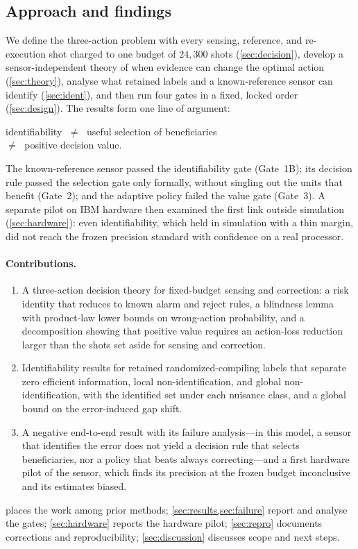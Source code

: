 \documentclass[10pt,twocolumn]{article}
\theoremstyle{definition}
\theoremstyle{remark}
\begin{document}
\subsection{Approach and findings}
We define the three-action problem with every sensing, reference, and re-execution shot charged to one budget of $24{,}300$ shots (\cref{sec:decision}), develop a sensor-independent theory of when evidence can change the optimal action (\cref{sec:theory}), analyse what retained labels and a known-reference sensor can identify (\cref{sec:ident}), and then run four gates in a fixed, locked order (\cref{sec:design}). The results form one line of argument:
\begin{center}
identifiability $\;\neq\;$ useful selection of beneficiaries\\ $\neq\;$ positive decision value.
\end{center}
The known-reference sensor passed the identifiability gate (Gate~1B); its decision rule passed the selection gate only formally, without singling out the units that benefit (Gate~2); and the adaptive policy failed the value gate (Gate~3). A separate pilot on IBM hardware then examined the first link outside simulation (\cref{sec:hardware}): even identifiability, which held in simulation with a thin margin, did not reach the frozen precision standard with confidence on a real processor.

\paragraph{Contributions.}
\begin{enumerate}
\item A three-action decision theory for fixed-budget sensing and correction: a risk identity that reduces to known alarm and reject rules, a blindness lemma with product-law lower bounds on wrong-action probability, and a decomposition showing that positive value requires an action-loss reduction larger than the shots set aside for sensing and correction.
\item Identifiability results for retained randomized-compiling labels that separate zero efficient information, local non-identification, and global non-identification, with the identified set under each nuisance class, and a global bound on the error-induced gap shift.
\item A negative end-to-end result with its failure analysis---in this model, a sensor that identifies the error does not yield a decision rule that selects beneficiaries, nor a policy that beats always correcting---and a first hardware pilot of the sensor, which finds its precision at the frozen budget inconclusive and its estimates biased.
\end{enumerate}
 places the work among prior methods; \cref{sec:results,sec:failure} report and analyse the gates; \cref{sec:hardware} reports the hardware pilot; \cref{sec:repro} documents corrections and reproducibility; \cref{sec:discussion} discusses scope and next steps.
\end{document}
